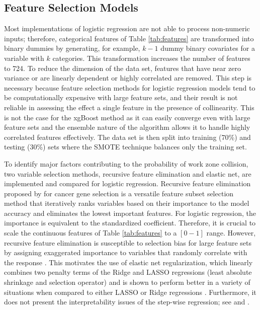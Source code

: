 \documentclass[10pt,a4paper]{article}
\begin{document}
\subsection{Feature Selection Models} \label{sse:feature}
Most implementations of logistic %
regression are not able to process non-numeric inputs; therefore, categorical features of Table \ref{tab:features} are transformed into binary dummies by generating, for example, $k - 1$ dummy binary covariates for a variable with $k$ categories. This transformation increases the number of features to 724. To reduce the dimension of the data set, features that have near zero variance or are linearly dependent or highly correlated are removed. This step is necessary because feature selection methods for logistic %
regression models tend to be computationally expensive with large feature sets, and their result is not reliable in assessing the effect a single feature in the presence of collinearity. This is not the case for the xgBoost method as it can easily converge even with large feature sets and the ensemble nature of the algorithm allows it to handle highly correlated features effectively. The data set is then split into training (70\%) and testing (30\%) sets where the SMOTE technique balances only the training set.

To identify major factors contributing to the probability of work zone collision, %
two variable selection methods, recursive feature elimination and elastic net, are implemented and compared for logistic regression. Recursive feature elimination proposed by \cite{guyon2002gene} for cancer gene selection is a versatile feature subset selection method that iteratively ranks variables based on their importance to the model accuracy and eliminates the lowest important features. For logistic regression, the importance is equivalent to the standardized coefficient. Therefore, it is crucial to scale the continuous features of Table \ref{tab:features} to a $[0-1]$ range. However, recursive feature elimination is susceptible to selection bias for large feature sets by assigning exaggerated importance to variables that randomly correlate with the response \citep{ambroise2002selection}. This motivates the use of elastic net regularization, which linearly combines two penalty terms of the Ridge and LASSO regressions (least absolute shrinkage and selection operator) and is shown to perform better in a variety of situations when compared to either LASSO or Ridge regressions \citep{zou2005regularization}. Furthermore, it does not present the interpretability issues of the step-wise regression; see \cite{flom2007stopping} and \cite{harrell2015regression}.
\end{document}
